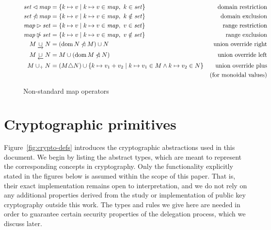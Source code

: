 \documentclass[11pt,a4paper,dvipsnames]{article}
\theoremstyle{definition}
\theoremstyle{definition}
\begin{document}
\begin{figure}
  \begin{align*}
    \mathit{set} \lhd \mathit{map}
    & = \{ k \mapsto v \mid k \mapsto v \in \mathit{map}, ~ k \in \mathit{set} \}
    & \text{domain restriction}
    \\
    \mathit{set} \mathbin{\slashed{\lhd}} \mathit{map}
    & = \{ k \mapsto v \mid k \mapsto v \in \mathit{map}, ~ k \notin \mathit{set} \}
    & \text{domain exclusion}
    \\
    \mathit{map} \rhd \mathit{set}
    & = \{ k \mapsto v \mid k \mapsto v \in \mathit{map}, ~ v \in \mathit{set} \}
    & \text{range restriction}
    \\
    \mathit{map} \mathbin{\slashed{\rhd}} \mathit{set}
    & = \{ k \mapsto v \mid k \mapsto v \in \mathit{map}, ~ v \notin \mathit{set} \}
    & \text{range exclusion}
    \\
    M \mathbin{\underrightarrow\cup} N
    & = (\operatorname{dom} N \mathbin{\slashed{\lhd}} M)\cup N
    & \text{union override right}
    \\
    M \mathbin{\underleftarrow\cup} N
    & = M \cup (\operatorname{dom} M \mathbin{\slashed{\lhd}} N)
    & \text{union override left}
    \\
    M \mathbin{\cup_{+}} N
    & = (M \triangle N)
    \cup \{k\mapsto v_1+v_2\mid {k\mapsto v_1}\in M \land {k\mapsto v_2}\in N \}
    & \text{union override plus} \\
    & & \text{(for monoidal values)}\\
  \end{align*}
  \caption{Non-standard map operators}
  \label{fig:notation:nonstandard}
\end{figure}


\section{Cryptographic primitives}
\label{sec:crypto-primitives}


Figure~\ref{fig:crypto-defs} introduces the cryptographic abstractions used in
this document. We begin by listing the abstract types, which are meant to
represent the corresponding concepts in cryptography. Only the functionality
explicitly stated in the figures below is assumed within the scope of this paper.
That is, their exact
implementation remains open to interpretation, and we do not rely on
any additional properties derived from the study or implementation of public key
cryptography outside this work. The types and rules we give here are needed in
order to guarantee certain security properties of the delegation process, which
we discuss later.
\end{document}
